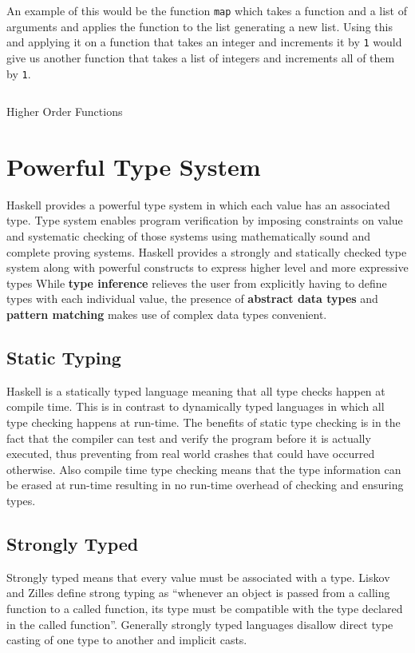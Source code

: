 An example of this would be the function \texttt{map} which takes a function and a list of arguments and applies the function to the list
generating a new list. Using this and applying it on a function that takes an integer and increments it by \texttt{1} would give us another
function that takes a list of integers and increments all of them by \texttt{1}.

\begin{listing}
\inputminted{haskell}{hs/higher_order.hs}
\caption{Higher Order Functions}
\end{listing}

\section{Powerful Type System}
Haskell provides a powerful type system in which each value has an associated type.
Type system enables program verification by imposing constraints on value and systematic checking of those systems using mathematically
sound and complete proving systems.
Haskell provides a strongly and statically checked type system along with powerful constructs to express higher level and more expressive types
While \textbf{type inference} relieves the user from explicitly having to define types with each individual value,
the presence of \textbf{abstract data types} and \textbf{pattern matching} makes use of complex data types convenient.

\subsection{Static Typing}
Haskell is a statically typed language meaning that all type checks happen at compile time. This is in contrast to dynamically typed languages
in which all type checking happens at run-time. The benefits of static type checking is in the fact that the compiler can test and verify the
program before it is actually executed, thus preventing from real world crashes that could have occurred otherwise.
Also compile time type checking means that the type information can be erased at run-time resulting in no run-time overhead of checking
and ensuring types.

\subsection{Strongly Typed}
Strongly typed means that every value must be associated with a type.
Liskov and Zilles define strong typing as ``whenever an object is passed from a calling function to a called function,
 its type must be compatible with the type declared in the called function''\cite{LZ74}.
Generally strongly typed languages disallow direct type casting of one type to another and implicit casts.


